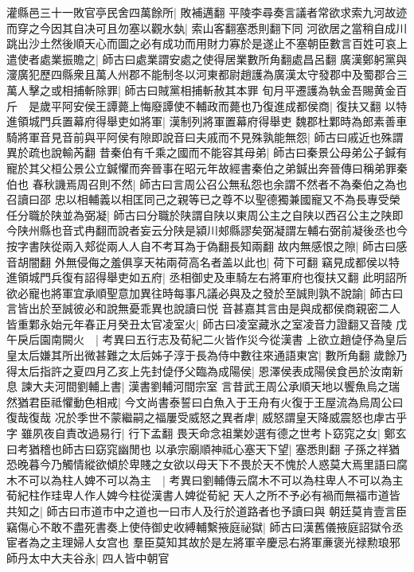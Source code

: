 灌縣邑三十一敗官亭民舍四萬餘所|{
	敗補邁翻}
平陵李尋奏言議者常欲求索九河故迹而穿之今因其自决可且勿塞以觀水埶|{
	索山客翻塞悉則翻下同}
河欲居之當稍自成川跳出沙土然後順天心而圖之必有成功而用財力寡於是遂止不塞朝臣數言百姓可哀上遣使者處業振贍之|{
	師古曰處業謂安處之使得居業數所角翻處昌呂翻}
廣漢鄭躬黨與濅廣犯歷四縣衆且萬人州郡不能制冬以河東都尉趙護為廣漢太守發郡中及蜀郡合三萬人擊之或相捕斬除罪|{
	師古曰賊黨相捕斬赦其本罪}
旬月平遷護為執金吾賜黄金百斤　是歲平阿安侯王譚薨上悔廢譚使不輔政而薨也乃復進成都侯商|{
	復扶又翻}
以特進領城門兵置幕府得舉吏如將軍|{
	漢制列將軍置幕府得舉吏}
魏郡杜鄴時為郎素善車騎將軍音見音前與平阿侯有隙即說音曰夫戚而不見殊孰能無怨|{
	師古曰戚近也殊謂異於疏也說輸芮翻}
昔秦伯有千乘之國而不能容其母弟|{
	師古曰秦景公母弟公子鍼有寵於其父桓公景公立鍼懼而奔晉事在昭元年故經書秦伯之弟鍼出奔晉傳曰稱弟罪秦伯也}
春秋譏焉周召則不然|{
	師古曰言周公召公無私怨也余謂不然者不為秦伯之為也召讀曰邵}
忠以相輔義以相匡同己之親等已之尊不以聖德獨兼國寵又不為長專受榮任分職於陕並為弼凝|{
	師古曰分職於陕謂自陕以東周公主之自陕以西召公主之陕即今陕州縣也音式冉翻而說者妄云分陕是潁川郟縣謬矣弼凝謂左輔右弼前凝後丞也今按字書陕從兩入郏從兩人人自不考耳為于偽翻長知兩翻}
故内無感恨之隙|{
	師古曰感音胡闇翻}
外無侵侮之羞俱享天祐兩荷高名者盖以此也|{
	荷下可翻}
竊見成都侯以特進領城門兵復有詔得舉吏如五府|{
	丞相御史及車騎左右將軍府也復扶又翻}
此明詔所欲必寵也將軍宜承順聖意加異往時每事凡議必與及之發於至誠則孰不說諭|{
	師古曰言皆出於至誠彼必和說無憂乖異也說讀曰悦}
音甚嘉其言由是與成都侯商親密二人皆重鄴永始元年春正月癸丑太官凌室火|{
	師古曰凌室藏氷之室凌音力證翻又音陵}
戊午戾后園南闕火　|{
	考異曰五行志及荀紀二火皆作災今從漢書}
上欲立趙偼伃為皇后皇太后嫌其所出微甚難之太后姊子淳于長為侍中數往來通語東宮|{
	數所角翻}
歲餘乃得太后指許之夏四月乙亥上先封偼伃父臨為成陽侯|{
	恩澤侯表成陽侯食邑於汝南新息}
諫大夫河間劉輔上書|{
	漢書劉輔河間宗室}
言昔武王周公承順天地以饗魚烏之瑞然猶君臣祗懼動色相戒|{
	今文尚書泰誓曰白魚入于王舟有火復于王屋流為烏周公曰復哉復哉}
况於季世不蒙繼嗣之福屢受威怒之異者虖|{
	威怒謂皇天降威震怒也虖古乎字}
雖夙夜自責改過易行|{
	行下孟翻}
畏天命念祖業妙選有德之世考卜窈窕之女|{
	鄭玄曰考猶稽也師古曰窈窕幽閒也}
以承宗廟順神祗心塞天下望|{
	塞悉則翻}
子孫之祥猶恐晚暮今乃觸情縱欲傾於卑賤之女欲以母天下不畏於天不愧於人惑莫大焉里語曰腐木不可以為柱人婢不可以為主　|{
	考異曰劉輔傳云腐木不可以為柱卑人不可以為主荀紀柱作珪卑人作人婢今柱從漢書人婢從荀紀}
天人之所不予必有禍而無福市道皆共知之|{
	師古曰市道市中之道也一曰市人及行於道路者也予讀曰與}
朝廷莫肯壹言臣竊傷心不敢不盡死書奏上使侍御史收縛輔繫掖庭祕獄|{
	師古曰漢舊儀掖庭詔獄令丞宦者為之主理婦人女宫也}
羣臣莫知其故於是左將軍辛慶忌右將軍亷褒光禄勲琅邪師丹太中大夫谷永|{
	四人皆中朝官}
